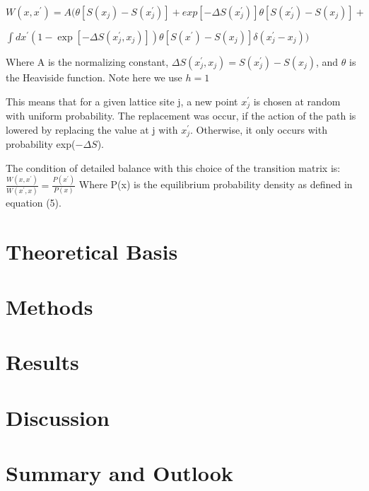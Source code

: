 \documentclass{article}
\begin{document}
$W(x, x^\prime)= A\bigg(\theta[S(x_j)-S(x_j^\prime)]+ exp[-\Delta  S(x_j^\prime)]\theta[S(x_j^\prime)- S(x_j)]+ $

$\int d x^\prime(1-\exp[-\Delta S(x_j^\prime , x_j)])\theta [S(x^\prime)- S(x_j)] \delta (x_j ^\prime-x_j) \bigg)$

Where A is the normalizing constant, 
$\Delta S(x_j^\prime,x_j) = S(x_j^\prime) - S(x_j)$, and $\theta$ is the Heaviside function. Note here we use $h=1$

This means that for a given lattice site j, a new point $x_j^\prime$ is chosen at random with uniform probability. The replacement was occur, if the action of the path is lowered by replacing the value at j with $x_j^\prime$. Otherwise, it only occurs with probability exp($-\Delta S$).

The condition of detailed balance with this choice of the transition matrix is:\\
$\frac{W(x, x^\prime)}{W(x^\prime , x)}=\frac{P(x^\prime)}{P(x)}$
Where P(x) is the equilibrium probability density as defined in equation (5).

	
	\section{Theoretical Basis}
	\section{Methods}
	\section{Results}
	\section{Discussion}
	\section{Summary and Outlook}
\end{document}
